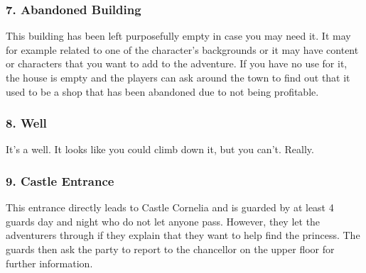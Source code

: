 \subsubsection*{7. Abandoned Building}
This building has been left purposefully empty in case you may need it.
It may for example related to one of the character's backgrounds or it may have content or characters that you want to add to the adventure.
If you have no use for it, the house is empty and the players can ask around the town to find out that it used to be a shop that has been abandoned due to not being profitable.

\subsubsection*{8. Well}
It's a well. It looks like you could climb down it, but you can't. Really.

\subsubsection*{9. Castle Entrance}
This entrance directly leads to Castle Cornelia and is guarded by at least 4 guards day and night who do not let anyone pass.
However, they let the adventurers through if they explain that they want to help find the princess.
The guards then ask the party to report to the chancellor on the upper floor for further information.